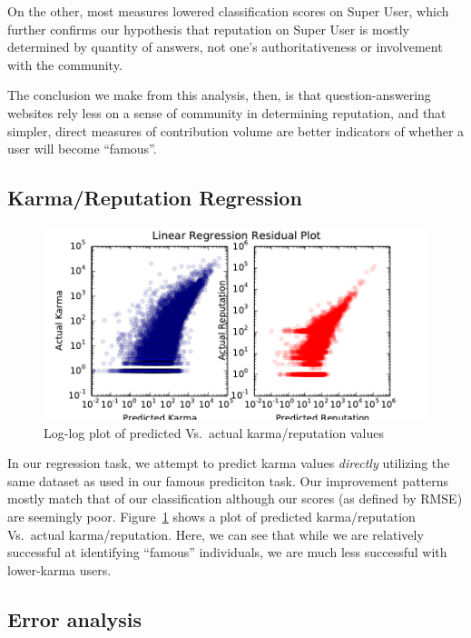 \documentclass[11pt]{article}
\begin{document}
On the other, most measures lowered classification scores on Super User, which
further confirms our hypothesis that reputation on Super User is mostly
determined by quantity of answers, not one's authoritativeness or involvement
with the community.

The conclusion we make from this analysis, then, is that question-answering
websites rely less on a sense of community in determining reputation, and that
simpler, direct measures of contribution volume are better indicators of whether
a user will become ``famous''.

\subsection{Karma/Reputation Regression}
\label{sec:regression}
\begin{figure}[h]
\centering
\includegraphics[width=\linewidth]{residuals}
\caption{Log-log plot of predicted Vs.\ actual karma/reputation values}
\label{fig:residuals}
\end{figure}

In our regression task, we attempt to predict karma values \textit{directly}
utilizing the same dataset as used in our famous prediciton task. Our
improvement patterns mostly match that of our classification although our scores
(as defined by RMSE) are seemingly poor. Figure~\ref{fig:residuals} shows a plot
of predicted karma/reputation Vs.\ actual karma/reputation. Here, we can see that
while we are relatively successful at identifying ``famous'' individuals, we are
much less successful with lower-karma users.


\subsection{Error analysis}
\end{document}
